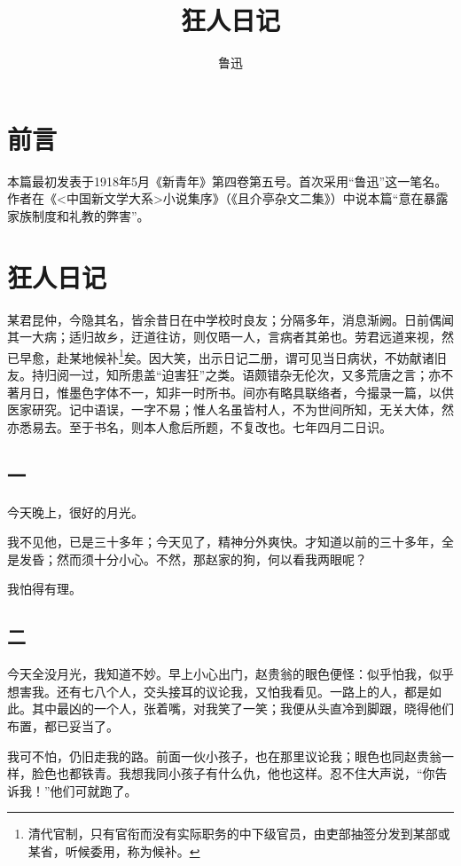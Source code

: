 \documentclass[12pt,UTF8]{ctexbook}
\title{\heiti\zihao{0} 狂人日记}
\author{鲁迅}
\date{}
\begin{document}
\maketitle
\tableofcontents

\frontmatter
\chapter{前言}

本篇最初发表于1918年5月《新青年》第四卷第五号。首次采用“鲁迅”这一笔名。作者在《<中国新文学大系>小说集序》（《且介亭杂文二集》）中说本篇“意在暴露家族制度和礼教的弊害”。

\mainmatter

\chapter{狂人日记}

某君昆仲，今隐其名，皆余昔日在中学校时良友；分隔多年，消息渐阙。日前偶闻其一大病；适归故乡，迂道往访，则仅晤一人，言病者其弟也。劳君远道来视，然已早愈，赴某地候补\footnote{清代官制，只有官衔而没有实际职务的中下级官员，由吏部抽签分发到某部或某省，听候委用，称为候补。}矣。因大笑，出示日记二册，谓可见当日病状，不妨献诸旧友。持归阅一过，知所患盖“迫害狂”之类。语颇错杂无伦次，又多荒唐之言；亦不著月日，惟墨色字体不一，知非一时所书。间亦有略具联络者，今撮录一篇，以供医家研究。记中语误，一字不易；惟人名虽皆村人，不为世间所知，无关大体，然亦悉易去。至于书名，则本人愈后所题，不复改也。七年四月二日识。

\section{一}

今天晚上，很好的月光。

我不见他，已是三十多年；今天见了，精神分外爽快。才知道以前的三十多年，全是发昏；然而须十分小心。不然，那赵家的狗，何以看我两眼呢？

我怕得有理。

\section{二}

今天全没月光，我知道不妙。早上小心出门，赵贵翁的眼色便怪：似乎怕我，似乎想害我。还有七八个人，交头接耳的议论我，又怕我看见。一路上的人，都是如此。其中最凶的一个人，张着嘴，对我笑了一笑；我便从头直冷到脚跟，晓得他们布置，都已妥当了。

我可不怕，仍旧走我的路。前面一伙小孩子，也在那里议论我；眼色也同赵贵翁一样，脸色也都铁青。我想我同小孩子有什么仇，他也这样。忍不住大声说，“你告诉我！”他们可就跑了。
\end{document}
